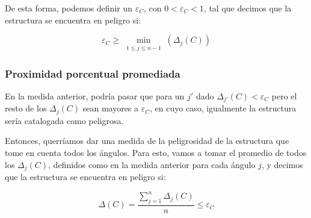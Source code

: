De esta forma, podemos definir un $\varepsilon_C$, con $0 < \varepsilon_C < 1 $, tal que decimos que la estructura se encuentra en peligro si:

$$\varepsilon_C \geq \min\limits_{\substack{1 \leq j \leq n-1}}(\Delta_j(C))$$

\subsubsection{Proximidad porcentual promediada}

En la medida anterior, podría pasar que para un $j'$ dado $\Delta_{j'}(C) < \varepsilon_C$ pero el resto de los $\Delta_j(C)$ sean mayores a $\varepsilon_C$, en cuyo caso, igualmente la estructura sería catalogada como peligrosa.

Entonces, querríamos dar una medida de la peligrosidad de la estructura que tome en cuenta todos los ángulos. Para esto, vamos a tomar el promedio de todos los $\Delta_j(C)$, definidos como en la medida anterior para cada ángulo $j$, y decimos que la estructura se encuentra en peligro si:

$$\Delta(C)= \frac{\sum\limits_{j=1}^{n}{\Delta_j(C)}}{n} \leq  \varepsilon_C$$
